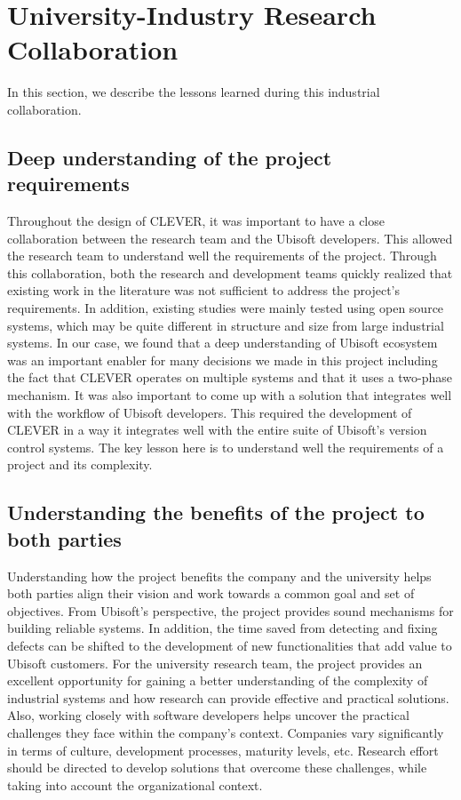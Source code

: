 \documentclass[12pt]{report}
\begin{document}
\section{University-Industry Research
Collaboration}\label{university-industry-research-collaboration}

In this section, we describe the lessons learned during this industrial
collaboration.

\subsection{Deep understanding of the project
requirements}\label{deep-understanding-of-the-project-requirements}

Throughout the design of CLEVER, it was important to have a close
collaboration between the research team and the Ubisoft developers. This
allowed the research team to understand well the requirements of the
project. Through this collaboration, both the research and development
teams quickly realized that existing work in the literature was not
sufficient to address the project's requirements. In addition, existing
studies were mainly tested using open source systems, which may be quite
different in structure and size from large industrial systems. In our
case, we found that a deep understanding of Ubisoft ecosystem was an
important enabler for many decisions we made in this project including
the fact that CLEVER operates on multiple systems and that it uses a
two-phase mechanism. It was also important to come up with a solution
that integrates well with the workflow of Ubisoft developers. This
required the development of CLEVER in a way it integrates well with the
entire suite of Ubisoft's version control systems. The key lesson here
is to understand well the requirements of a project and its complexity.

\subsection{Understanding the benefits of the project to both
parties}\label{understanding-the-benefits-of-the-project-to-both-parties}

Understanding how the project benefits the company and the university
helps both parties align their vision and work towards a common goal and
set of objectives. From Ubisoft's perspective, the project provides
sound mechanisms for building reliable systems. In addition, the time
saved from detecting and fixing defects can be shifted to the
development of new functionalities that add value to Ubisoft customers.
For the university research team, the project provides an excellent
opportunity for gaining a better understanding of the complexity of
industrial systems and how research can provide effective and practical
solutions. Also, working closely with software developers helps uncover
the practical challenges they face within the company's context.
Companies vary significantly in terms of culture, development processes,
maturity levels, etc. Research effort should be directed to develop
solutions that overcome these challenges, while taking into account the
organizational context.
\end{document}
